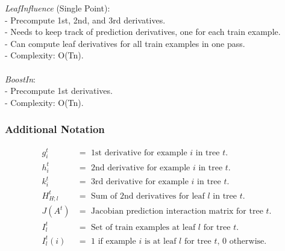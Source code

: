 \documentclass[12pt]{article}
\begin{document}
\emph{LeafInfluence} (Single Point):
\\
- Precompute 1st, 2nd, and 3rd derivatives.
\\
- Needs to keep track of prediction derivatives, one for each train example.
\\
- Can compute leaf derivatives for all train examples in one pass.
\\
- Complexity: O(Tn).
\\
\\
\emph{BoostIn}:
\\
- Precompute 1st derivatives.
\\
- Complexity: O(Tn).

\subsubsection*{Additional Notation}
\begin{align*}
g_i^t &= \text{ 1st derivative for example $i$ in tree $t$.} \\
h_i^t &= \text{ 2nd derivative for example $i$ in tree $t$.} \\
k_i^t &= \text{ 3rd derivative for example $i$ in tree $t$.} \\
H_{H;l}^t &= \text{ Sum of 2nd derivatives for leaf $l$ in tree $t$.} \\
J(A^t) &= \text{ Jacobian prediction interaction matrix for tree $t$.} \\
I_l^t &= \text{ Set of train examples at leaf $l$ for tree $t$.} \\
I_l^t(i) &= \text{ 1 if example $i$ is at leaf $l$ for tree $t$, 0 otherwise.}
\end{align*}
\end{document}
